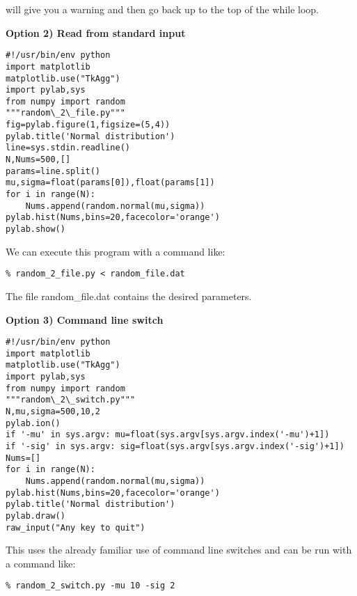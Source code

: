 {\noindent will give you a warning and then go back up to the top of the while loop.


  


{\bf \noindent Option 2) Read from standard input}


{\singlespacing \color{blue} \begin{verbatim}
#!/usr/bin/env python
import matplotlib
matplotlib.use("TkAgg")
import pylab,sys
from numpy import random
"""random\_2\_file.py"""
fig=pylab.figure(1,figsize=(5,4))
pylab.title('Normal distribution')
line=sys.stdin.readline()
N,Nums=500,[]
params=line.split()
mu,sigma=float(params[0]),float(params[1])
for i in range(N):
    Nums.append(random.normal(mu,sigma))
pylab.hist(Nums,bins=20,facecolor='orange')
pylab.show()
\end{verbatim}}

We can execute this program with a command like:

{\color{blue}\begin{verbatim}
% random_2_file.py < random_file.dat  
 \end{verbatim}}
   
   \noindent The file {\color{blue}random\_file.dat} contains the desired parameters.
   
   
 
 
 
{\bf \noindent Option 3)  Command line switch}

{\singlespacing \color{blue} \begin{verbatim}
#!/usr/bin/env python
import matplotlib
matplotlib.use("TkAgg")
import pylab,sys
from numpy import random
"""random\_2\_switch.py"""
N,mu,sigma=500,10,2
pylab.ion()
if '-mu' in sys.argv: mu=float(sys.argv[sys.argv.index('-mu')+1])
if '-sig' in sys.argv: sig=float(sys.argv[sys.argv.index('-sig')+1])
Nums=[]
for i in range(N):
    Nums.append(random.normal(mu,sigma))
pylab.hist(Nums,bins=20,facecolor='orange')
pylab.title('Normal distribution')
pylab.draw()
raw_input("Any key to quit")
\end{verbatim}}

This uses the already familiar use of command line switches and can be run with a command like:  


{\color{blue}\begin{verbatim}
% random_2_switch.py -mu 10 -sig 2
 \end{verbatim}}

}
